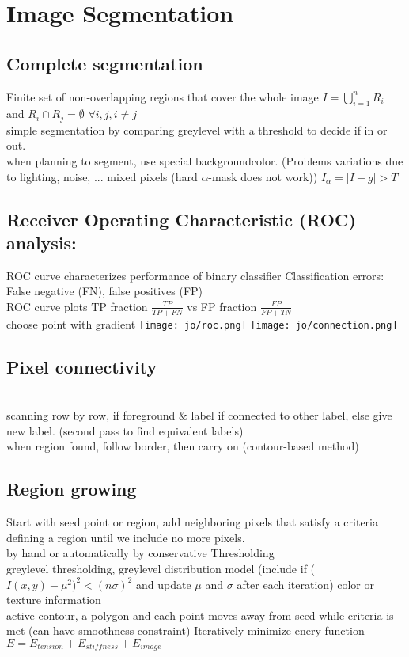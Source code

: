 \section*{Image Segmentation}
\subsection*{Complete segmentation}
Finite set of non-overlapping regions that cover the whole image $I = \bigcup_{i = 1}^{n} R_i$ and $R_i \cap R_j = \emptyset$ $\forall i, j, i \neq j$\\
 simple segmentation by comparing greylevel with a threshold to decide if in or out.\\
 when planning to segment, use special backgroundcolor. (Problems variations due to lighting, noise, ... mixed pixels (hard $\alpha$-mask does not work)) $I_\alpha = |I - g| > T$
\subsection*{Receiver Operating Characteristic (ROC) analysis:}
ROC curve characterizes performance of binary classifier Classification errors: False negative (FN), false positives (FP)\\
ROC curve plots TP fraction $\frac{TP}{TP + FN}$ vs FP fraction $\frac{FP}{FP + TN}$\\
 choose point with gradient
\texttt{[image: jo/roc.png]} \texttt{[image: jo/connection.png]}
\subsection*{Pixel connectivity}
\\
 scanning row by row, if foreground \& label if connected to other label, else give new label. (second pass to find equivalent labels)\\
 when region found, follow border, then carry on (contour-based method)
\subsection*{Region growing}
Start with seed point or region, add neighboring pixels that satisfy a criteria defining a region until we include no more pixels.\\
 by hand or automatically by conservative Thresholding\\
 greylevel thresholding, greylevel distribution model (include if ($I(x, y) - \mu^{2})^{2} < (n \sigma)^{2}$ and update $\mu$ and $\sigma$ after each iteration) color or texture information\\
 active contour, a polygon and each point moves away from seed while criteria is met (can have smoothness constraint) Iteratively minimize enery function $E = E_{tension} + E_{stiffness} + E_{image}$
